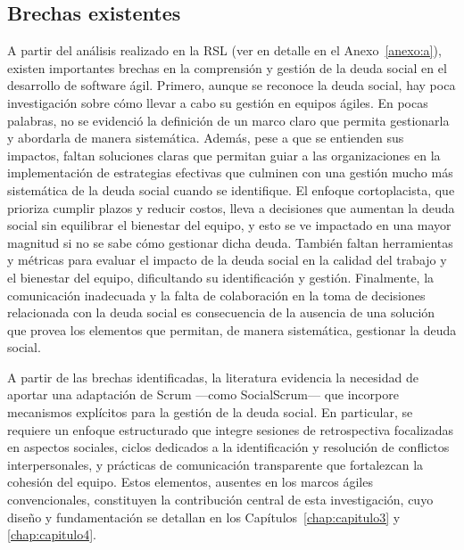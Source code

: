 \subsection{Brechas existentes}

A partir del análisis realizado en la RSL (ver en detalle en el Anexo~\ref{anexo:a}), existen importantes brechas en la comprensión y gestión de la deuda social en el desarrollo de software ágil. Primero, aunque se reconoce la deuda social, hay poca investigación sobre cómo llevar a cabo su gestión en equipos ágiles. En pocas palabras, no se evidenció la definición de un marco claro que permita gestionarla y abordarla de manera sistemática. Además, pese a que se entienden sus impactos, faltan soluciones claras que permitan guiar a las organizaciones en la implementación de estrategias efectivas que culminen con una gestión mucho más sistemática de la deuda social cuando se identifique. El enfoque cortoplacista, que prioriza cumplir plazos y reducir costos, lleva a decisiones que aumentan la deuda social sin equilibrar el bienestar del equipo, y esto se ve impactado en una mayor magnitud si no se sabe cómo gestionar dicha deuda. También faltan herramientas y métricas para evaluar el impacto de la deuda social en la calidad del trabajo y el bienestar del equipo, dificultando su identificación y gestión. Finalmente, la comunicación inadecuada y la falta de colaboración en la toma de decisiones relacionada con la deuda social es consecuencia de la ausencia de una solución que provea los elementos que permitan, de manera sistemática, gestionar la deuda social.

A partir de las brechas identificadas, la literatura evidencia la necesidad de aportar una adaptación de Scrum ---como SocialScrum--- que incorpore mecanismos explícitos para la gestión de la deuda social. En particular, se requiere un enfoque estructurado que integre sesiones de retrospectiva focalizadas en aspectos sociales, ciclos dedicados a la identificación y resolución de conflictos interpersonales, y prácticas de comunicación transparente que fortalezcan la cohesión del equipo. Estos elementos, ausentes en los marcos ágiles convencionales, constituyen la contribución central de esta investigación, cuyo diseño y fundamentación se detallan en los Capítulos~\ref{chap:capitulo3} y \ref{chap:capitulo4}.
